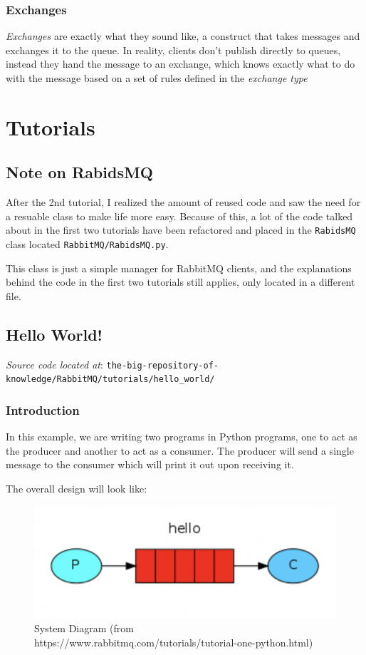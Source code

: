 \documentclass{article}
\begin{document}
\subsubsection{Exchanges}

\textit{Exchanges} are exactly what they sound like, a construct that takes messages and exchanges it to the queue. In reality, clients don't publish directly to queues, instead they hand the message to an exchange, which knows exactly what to do with the message based on a set of rules defined in the \textit{exchange type}

\section{Tutorials}

\subsection{Note on RabidsMQ}

After the 2nd tutorial, I realized the amount of reused code and saw the need for a resuable class to make life more easy. Because of this, a lot of the code talked about in the first two tutorials have been refactored and placed in the \verb|RabidsMQ| class located \verb|RabbitMQ/RabidsMQ.py|.

This class is just a simple manager for RabbitMQ clients, and the explanations behind the code in the first two tutorials still applies, only located in a different file.

\subsection{Hello World!}

\textit{Source code located at}: \verb|the-big-repository-of-knowledge/RabbitMQ/tutorials/hello_world/|

\subsubsection{Introduction}

In this example, we are writing two programs in Python programs, one to act as the producer and another to act as a consumer. The producer will send a single message to the consumer which will print it out upon receiving it. 

The overall design will look like: 

\begin{figure}[H]
    \centering
    \includegraphics[scale=0.8]{RabbitMQ/images/t1-1.png}
    \caption{System Diagram (from https://www.rabbitmq.com/tutorials/tutorial-one-python.html)}
    \label{t1-1}
\end{figure}
\end{document}
